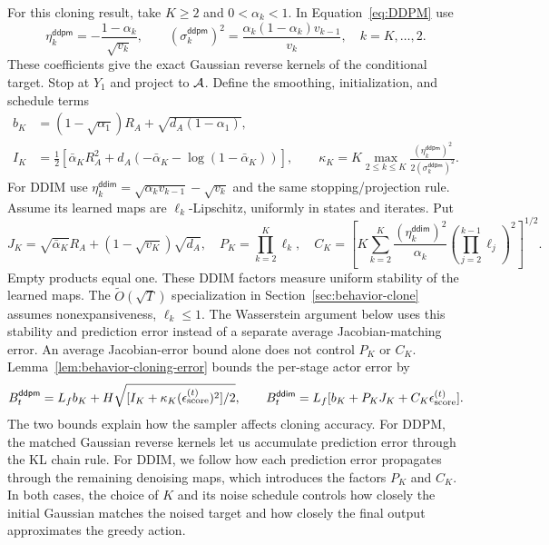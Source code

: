 For this cloning result, take $K\ge2$ and $0<\alpha_k<1$. In Equation~\ref{eq:DDPM} use
\[
 \eta_k^{\mathsf{ddpm}}=-\frac{1-\alpha_k}{\sqrt{v_k}},\qquad
 (\sigma_k^{\mathsf{ddpm}})^2=\frac{\alpha_k(1-\alpha_k)v_{k-1}}{v_k},\quad k=K,\ldots,2.
\]
These coefficients give the exact Gaussian reverse kernels of the conditional target. Stop at $Y_1$ and project to ${\mathcal{A}}$. Define the smoothing, initialization, and schedule terms
\begin{align*}
 b_K&=(1-\sqrt{\alpha_1})R_A+\sqrt{d_A(1-\alpha_1)},\\
 I_K&=\tfrac12[\bar\alpha_KR_A^2+d_A(-\bar\alpha_K-\log(1-\bar\alpha_K))],\qquad
 \kappa_K=K\max_{2\le k\le K}\frac{(\eta_k^{\mathsf{ddpm}})^2}{2(\sigma_k^{\mathsf{ddpm}})^2}.
\end{align*}
For DDIM use $\eta_k^{\mathsf{ddim}}=\sqrt{\alpha_kv_{k-1}}-\sqrt{v_k}$ and the same stopping/projection rule. Assume its learned maps are $\ell_k$-Lipschitz, uniformly in states and iterates. Put
\[
 J_K=\sqrt{\bar\alpha_K}R_A+(1-\sqrt{v_K})\sqrt{d_A},\quad
 P_K=\prod_{k=2}^K\ell_k,\quad
 C_K=\left[K\sum_{k=2}^K\frac{(\eta_k^{\mathsf{ddim}})^2}{\alpha_k}
              \left(\prod_{j=2}^{k-1}\ell_j\right)^2\right]^{1/2}.
\]
Empty products equal one. These DDIM factors measure uniform stability of the learned maps. The $\widetilde O(\sqrt T)$ specialization in Section~\ref{sec:behavior-clone} assumes nonexpansiveness, $\ell_k\le1$. The Wasserstein argument below uses this stability and prediction error instead of a separate average Jacobian-matching error. An average Jacobian-error bound alone does not control $P_K$ or $C_K$. Lemma~\ref{lem:behavior-cloning-error} bounds the per-stage actor error by
\[
 B_t^{\mathsf{ddpm}}=L_f b_K+H\sqrt{[I_K+\kappa_K(\epsilon_{\text{score}}^{(t)})^2]/2},\qquad
 B_t^{\mathsf{ddim}}=L_f[b_K+P_KJ_K+C_K\epsilon_{\text{score}}^{(t)}].
\]
The two bounds explain how the sampler affects cloning accuracy. For DDPM, the matched Gaussian reverse kernels let us accumulate prediction error through the KL chain rule. For DDIM, we follow how each prediction error propagates through the remaining denoising maps, which introduces the factors $P_K$ and $C_K$. In both cases, the choice of $K$ and its noise schedule controls how closely the initial Gaussian matches the noised target and how closely the final output approximates the greedy action.

